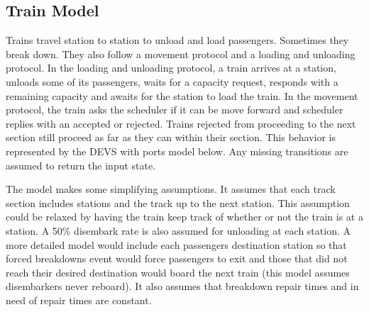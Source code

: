 \subsection{Train Model}

Trains travel station to station to unload and load passengers. Sometimes they
break down. They also follow a movement protocol and a loading and unloading
protocol. In the loading and unloading protocol, a train arrives at a station,
unloads some of its passengers, waits for a capacity request, responds with a
remaining capacity and awaits for the station to load the train. In the movement
protocol, the train asks the scheduler if it can be move forward and scheduler
replies with an accepted or rejected. Trains rejected from proceeding to the
next section still proceed as far as they can within their section. This
behavior is represented by the DEVS with ports model below. Any missing
transitions are assumed to return the input state. 

The model makes some simplifying assumptions. It assumes that each track section
includes stations and the track up to the next station. This assumption could be
relaxed by having the train keep track of whether or not the train is at a
station. A 50\% disembark rate is also assumed for unloading at each station. A
more detailed model would include each passengers destination station so that
forced breakdowns event would force passengers to exit and those that did not
reach their desired destination would board the next train (this model assumes
disembarkers never reboard). It also assumes that breakdown repair times and in
need of repair times are constant.

\newcommand{\InBreakDown}[0]{(\text{``Breakdown''}, ())}
\newcommand{\InCapReq}[0]{(\text{``Capacity Request''}, ())}
\newcommand{\InMoveRes}[1]{(\text{``Move Response''}, #1)}
\newcommand{\InLoadPassengers}[1]{(\text{``Load Passengers''}, #1)}

\newcommand{\OutRemainingCapacity}[1]{(\text{``Remaining Capacity''}, #1)}
\newcommand{\OutUnloadPassengers}[1]{(\text{``Unload Passengers''}, #1)}
\newcommand{\OutMoveReq}[1]{(\text{``Move Request''}, #1)}
\newcommand{\phase}[0]{\text{phase}}

\newcommand{\Mod}[2]{\mathrm{mod} (#1, #2)}

